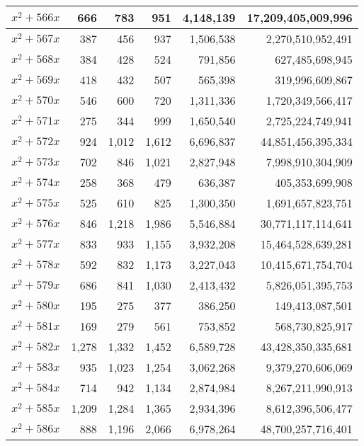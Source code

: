 \documentclass[a4paper]{amsproc}
\theoremstyle{plain}
\theoremstyle{named}
\begin{document}
\begin{longtable}{ | l | r | r | r | r | r | }
$x^2 + 566x$ & 666 & 783 & 951 & 4{,}148{,}139 & 17{,}209{,}405{,}009{,}996 \\ \hline
$x^2 + 567x$ & 387 & 456 & 937 & 1{,}506{,}538 & 2{,}270{,}510{,}952{,}491 \\ \hline
$x^2 + 568x$ & 384 & 428 & 524 & 791{,}856 & 627{,}485{,}698{,}945 \\ \hline
$x^2 + 569x$ & 418 & 432 & 507 & 565{,}398 & 319{,}996{,}609{,}867 \\ \hline
$x^2 + 570x$ & 546 & 600 & 720 & 1{,}311{,}336 & 1{,}720{,}349{,}566{,}417 \\ \hline
$x^2 + 571x$ & 275 & 344 & 999 & 1{,}650{,}540 & 2{,}725{,}224{,}749{,}941 \\ \hline
$x^2 + 572x$ & 924 & 1{,}012 & 1{,}612 & 6{,}696{,}837 & 44{,}851{,}456{,}395{,}334 \\ \hline
$x^2 + 573x$ & 702 & 846 & 1{,}021 & 2{,}827{,}948 & 7{,}998{,}910{,}304{,}909 \\ \hline
$x^2 + 574x$ & 258 & 368 & 479 & 636{,}387 & 405{,}353{,}699{,}908 \\ \hline
$x^2 + 575x$ & 525 & 610 & 825 & 1{,}300{,}350 & 1{,}691{,}657{,}823{,}751 \\ \hline
$x^2 + 576x$ & 846 & 1{,}218 & 1{,}986 & 5{,}546{,}884 & 30{,}771{,}117{,}114{,}641 \\ \hline
$x^2 + 577x$ & 833 & 933 & 1{,}155 & 3{,}932{,}208 & 15{,}464{,}528{,}639{,}281 \\ \hline
$x^2 + 578x$ & 592 & 832 & 1{,}173 & 3{,}227{,}043 & 10{,}415{,}671{,}754{,}704 \\ \hline
$x^2 + 579x$ & 686 & 841 & 1{,}030 & 2{,}413{,}432 & 5{,}826{,}051{,}395{,}753 \\ \hline
$x^2 + 580x$ & 195 & 275 & 377 & 386{,}250 & 149{,}413{,}087{,}501 \\ \hline
$x^2 + 581x$ & 169 & 279 & 561 & 753{,}852 & 568{,}730{,}825{,}917 \\ \hline
$x^2 + 582x$ & 1{,}278 & 1{,}332 & 1{,}452 & 6{,}589{,}728 & 43{,}428{,}350{,}335{,}681 \\ \hline
$x^2 + 583x$ & 935 & 1{,}023 & 1{,}254 & 3{,}062{,}268 & 9{,}379{,}270{,}606{,}069 \\ \hline
$x^2 + 584x$ & 714 & 942 & 1{,}134 & 2{,}874{,}984 & 8{,}267{,}211{,}990{,}913 \\ \hline
$x^2 + 585x$ & 1{,}209 & 1{,}284 & 1{,}365 & 2{,}934{,}396 & 8{,}612{,}396{,}506{,}477 \\ \hline
$x^2 + 586x$ & 888 & 1{,}196 & 2{,}066 & 6{,}978{,}264 & 48{,}700{,}257{,}716{,}401 \\ \hline

\end{longtable}
\end{document}
